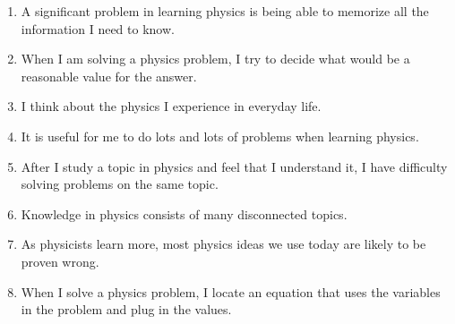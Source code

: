 \documentclass[addpoints,12pt]{exam}
\begin{document}

\clearpage

\begin{enumerate}
\item A significant problem in learning physics is being able to memorize all the information I need to know.
\begin{center}\end{center}

\item When I am solving a physics problem, I try to decide what would be a reasonable value for the answer.
\begin{center}\end{center}

\item I think about the physics I experience in everyday life.
\begin{center}\end{center}

\item It is useful for me to do lots and lots of problems when learning physics.
\begin{center}\end{center}

\item After I study a topic in physics and feel that I understand it, I have difficulty solving problems on the same topic.
\begin{center}\end{center}

\item Knowledge in physics consists of many disconnected topics.
\begin{center}\end{center}

\item As physicists learn more, most physics ideas we use today are likely to be proven wrong.
\begin{center}\end{center}

\item When I solve a physics problem, I locate an equation that uses the variables  in the problem and plug in the values.
\begin{center}\end{center}


\end{enumerate}
\end{document}
